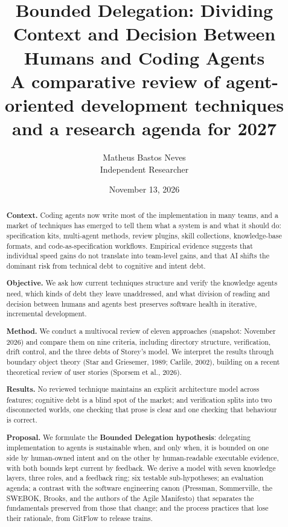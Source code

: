 \documentclass[11pt]{article}
\title{\Large Bounded Delegation: Dividing Context and Decision Between Humans and Coding Agents\\[4pt] \large A comparative review of agent-oriented development techniques and a research agenda for 2027}
\author{
  Matheus Bastos Neves\\
  \small Independent Researcher\\
  \small \contact
}
\date{November 13, 2026}
\begin{document}
\maketitle

\begin{abstract}
\textbf{Context.} Coding agents now write most of the implementation in many teams, and a market of techniques has emerged to tell them what a system is and what it should do: specification kits, multi-agent methods, review plugins, skill collections, knowledge-base formats, and code-as-specification workflows. Empirical evidence suggests that individual speed gains do not translate into team-level gains, and that AI shifts the dominant risk from technical debt to cognitive and intent debt.

\textbf{Objective.} We ask how current techniques structure and verify the knowledge agents need, which kinds of debt they leave unaddressed, and what division of reading and decision between humans and agents best preserves software health in iterative, incremental development.

\textbf{Method.} We conduct a multivocal review of eleven approaches (snapshot: November 2026) and compare them on nine criteria, including directory structure, verification, drift control, and the three debts of Storey's model. We interpret the results through boundary object theory (Star and Griesemer, 1989; Carlile, 2002), building on a recent theoretical review of user stories (Sporsem et al., 2026).

\textbf{Results.} No reviewed technique maintains an explicit architecture model across features; cognitive debt is a blind spot of the market; and verification splits into two disconnected worlds, one checking that prose is clear and one checking that behaviour is correct.

\textbf{Proposal.} We formulate the \textbf{Bounded Delegation hypothesis}: delegating implementation to agents is sustainable when, and only when, it is bounded on one side by human-owned intent and on the other by human-readable executable evidence, with both bounds kept current by feedback. We derive a model with seven knowledge layers, three roles, and a feedback ring; six testable sub-hypotheses; an evaluation agenda; a contrast with the software engineering canon (Pressman, Sommerville, the SWEBOK, Brooks, and the authors of the Agile Manifesto) that separates the fundamentals preserved from those that change; and the process practices that lose their rationale, from GitFlow to release trains.
\end{abstract}
\end{document}
